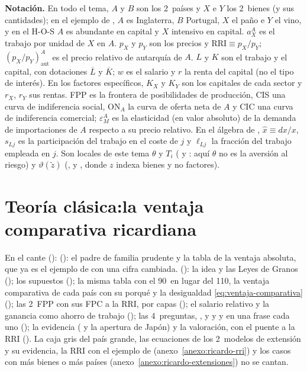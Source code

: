 \documentclass[11pt]{article}
\begin{document}
\begin{anotaciones}
\textbf{Notación.} En todo el tema, $A$ y $B$ son los 2~países y $X$ e $Y$ los 2~bienes (y sus cantidades); en el ejemplo de , $A$ es Inglaterra, $B$ Portugal, $X$ el paño e $Y$ el vino, y en el H-O-S $A$ es abundante en capital y $X$ intensivo en capital. $a_X^A$ es el trabajo por unidad de $X$ en $A$. $p_X$ y $p_Y$ son los precios y $\mathrm{RRI}\equiv p_X/p_Y$; $(p_X/p_Y)^A_{\mathrm{aut}}$ es el precio relativo de autarquía de $A$. $L$ y $K$ son el trabajo y el capital, con dotaciones $\overline L$ y $\overline K$; $w$ es el salario y $r$ la renta del capital (no el tipo de interés). En los factores específicos, $K_X$ y $K_Y$ son los capitales de cada sector y $r_X$, $r_Y$ sus rentas. FPP es la frontera de posibilidades de producción, CIS una curva de indiferencia social, ON$_A$ la curva de oferta neta de $A$ y CIC una curva de indiferencia comercial; $\varepsilon_M^A$ es la elasticidad (en valor absoluto) de la demanda de importaciones de $A$ respecto a su precio relativo. En el álgebra de , $\hat x\equiv dx/x$, $s_{Lj}$ es la participación del trabajo en el coste de $j$ y $\ell_{Lj}$ la fracción del trabajo empleada en $j$. Son locales de este tema $\theta$ y $T_i$ ( y : aquí $\theta$ no es la aversión al riesgo) y $\vartheta(\tilde z)$ (,  y , donde $z$ indexa bienes y no factores).
\end{anotaciones}

\section{Teoría clásica:\newline la ventaja comparativa ricardiana}\label{sec:clasico}

\begin{notaopositor}
En el cante ():  (): el padre de familia prudente y la tabla de la ventaja absoluta, que ya es el ejemplo de  con una cifra cambiada.  (): la idea y las Leyes de Granos (); los supuestos (); la misma tabla con el 90~en lugar del 110, la ventaja comparativa de cada país con su porqué y la desigualdad \eqref{eq:ventaja-comparativa} (); las 2~FPP con sus FPC a la RRI, por capas (); el salario relativo y la ganancia como ahorro de trabajo (); las 4~preguntas, ,  y  y  y  en una frase cada uno (); la evidencia ( y la apertura de Japón) y la valoración, con el puente a la RRI (). La caja gris del país grande, las ecuaciones de los 2~modelos de extensión y su evidencia, la RRI con el ejemplo de  (anexo~\ref{anexo:ricardo-rri}) y los casos con más bienes o más países (anexo~\ref{anexo:ricardo-extensiones}) no se cantan.
\end{notaopositor}
\end{document}
